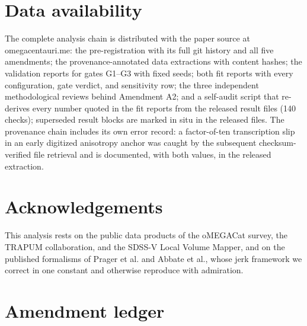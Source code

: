 \documentclass[11pt]{article}
\begin{document}
\section*{Data availability}
The complete analysis chain is distributed with the paper source at omegacentauri.me: the pre-registration with its full git history and all five amendments; the provenance-annotated data extractions with content hashes; the validation reports for gates G1--G3 with fixed seeds; both fit reports with every configuration, gate verdict, and sensitivity row; the three independent methodological reviews behind Amendment A2; and a self-audit script that re-derives every number quoted in the fit reports from the released result files (140 checks); superseded result blocks are marked in situ in the released files. The provenance chain includes its own error record: a factor-of-ten transcription slip in an early digitized anisotropy anchor was caught by the subsequent checksum-verified file retrieval and is documented, with both values, in the released extraction.

\section*{Acknowledgements}
This analysis rests on the public data products of the oMEGACat survey, the TRAPUM collaboration, and the SDSS-V Local Volume Mapper, and on the published formalisms of Prager et al. and Abbate et al., whose jerk framework we correct in one constant and otherwise reproduce with admiration.





\appendix

\section{Amendment ledger}
\label{app:ledger}
\end{document}
